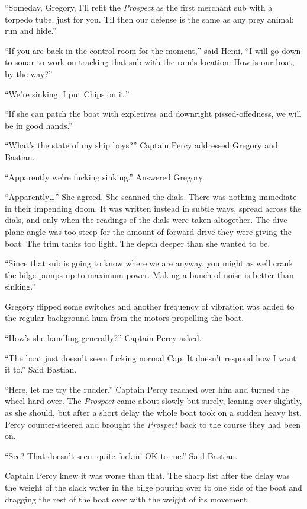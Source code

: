 \documentclass[]{article}
\begin{document}
``Someday, Gregory, I'll refit the \emph{Prospect} as the first merchant
sub with a torpedo tube, just for you. Til then our defense is the same
as any prey animal: run and hide.''

``If you are back in the control room for the moment,'' said Hemi, ``I
will go down to sonar to work on tracking that sub with the ram's
location. How is our boat, by the way?''

``We're sinking. I put Chips on it.''

``If she can patch the boat with expletives and downright
pissed-offedness, we will be in good hands.''

``What's the state of my ship boys?'' Captain Percy addressed Gregory
and Bastian.

``Apparently we're fucking sinking.'' Answered Gregory.

``Apparently\ldots{}'' She agreed. She scanned the dials. There was
nothing immediate in their impending doom. It was written instead in
subtle ways, spread across the dials, and only when the readings of the
dials were taken altogether. The dive plane angle was too steep for the
amount of forward drive they were giving the boat. The trim tanks too
light. The depth deeper than she wanted to be.

``Since that sub is going to know where we are anyway, you might as well
crank the bilge pumps up to maximum power. Making a bunch of noise is
better than sinking.''

Gregory flipped some switches and another frequency of vibration was
added to the regular background hum from the motors propelling the boat.

``How's she handling generally?'' Captain Percy asked.

``The boat just doesn't seem fucking normal Cap. It doesn't respond how
I want it to.'' Said Bastian.

``Here, let me try the rudder.'' Captain Percy reached over him and
turned the wheel hard over. The \emph{Prospect} came about slowly but
surely, leaning over slightly, as she should, but after a short delay
the whole boat took on a sudden heavy list. Percy counter-steered and
brought the \emph{Prospect} back to the course they had been on.

``See? That doesn't seem quite fuckin' OK to me.'' Said Bastian.

Captain Percy knew it was worse than that. The sharp list after the
delay was the weight of the slack water in the bilge pouring over to one
side of the boat and dragging the rest of the boat over with the weight
of its movement.
\end{document}

